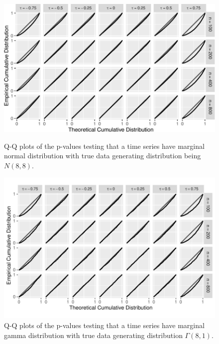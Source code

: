 \documentclass[12pt]{article}
\begin{document}
\begin{figure}[tbp]
  \includegraphics[width = .9\textwidth]{figures/normal}
  \centering
  \caption{Q-Q plots of the p-values testing that a time series
    have marginal normal distribution with true data generating distribution
    being $N(8,8)$.}
  \label{fig:qq_n}
    \hspace{5cm}
  \includegraphics[width = .9\textwidth]{figures/gamma}
  \caption{Q-Q plots of the p-values testing that a time series
    have marginal gamma distribution with true data
    generating distribution $\Gamma(8,1)$.}
  \label{fig:qq_g}
\end{figure}
\end{document}
